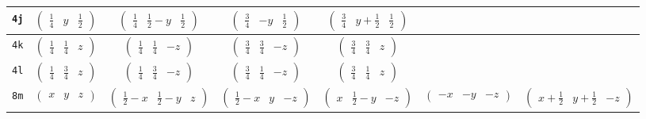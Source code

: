 \documentclass[fleqn,9pt,landscape]{jsarticle}
\begin{document}
\begin{center}
\begin{longtable}{ccccccc}
{\tt 4j} & $ \begin{pmatrix} \frac{1}{4} & y & \frac{1}{2} \end{pmatrix} $ & $ \begin{pmatrix} \frac{1}{4} & \frac{1}{2} - y & \frac{1}{2} \end{pmatrix} $ & $ \begin{pmatrix} \frac{3}{4} & - y & \frac{1}{2} \end{pmatrix} $ & $ \begin{pmatrix} \frac{3}{4} & y + \frac{1}{2} & \frac{1}{2} \end{pmatrix} $ & $  $ & $  $ \\ \hline
{\tt 4k} & $ \begin{pmatrix} \frac{1}{4} & \frac{1}{4} & z \end{pmatrix} $ & $ \begin{pmatrix} \frac{1}{4} & \frac{1}{4} & - z \end{pmatrix} $ & $ \begin{pmatrix} \frac{3}{4} & \frac{3}{4} & - z \end{pmatrix} $ & $ \begin{pmatrix} \frac{3}{4} & \frac{3}{4} & z \end{pmatrix} $ & $  $ & $  $ \\ \hline
{\tt 4l} & $ \begin{pmatrix} \frac{1}{4} & \frac{3}{4} & z \end{pmatrix} $ & $ \begin{pmatrix} \frac{1}{4} & \frac{3}{4} & - z \end{pmatrix} $ & $ \begin{pmatrix} \frac{3}{4} & \frac{1}{4} & - z \end{pmatrix} $ & $ \begin{pmatrix} \frac{3}{4} & \frac{1}{4} & z \end{pmatrix} $ & $  $ & $  $ \\ \hline
{\tt 8m} & $ \begin{pmatrix} x & y & z \end{pmatrix} $ & $ \begin{pmatrix} \frac{1}{2} - x & \frac{1}{2} - y & z \end{pmatrix} $ & $ \begin{pmatrix} \frac{1}{2} - x & y & - z \end{pmatrix} $ & $ \begin{pmatrix} x & \frac{1}{2} - y & - z \end{pmatrix} $ & $ \begin{pmatrix} - x & - y & - z \end{pmatrix} $ & $ \begin{pmatrix} x + \frac{1}{2} & y + \frac{1}{2} & - z \end{pmatrix} $ \\

\end{longtable}
\end{center}
\end{document}
